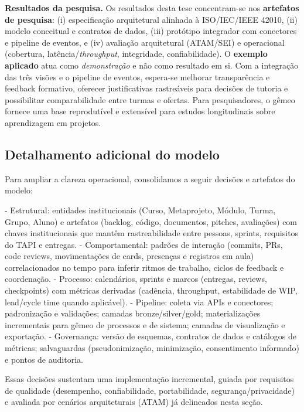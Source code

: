 \documentclass[12pt,a4paper]{article}
\begin{document}
\textbf{Resultados da pesquisa.} Os resultados desta tese concentram-se nos \textbf{artefatos de pesquisa}: (i) especificação arquitetural alinhada à ISO/IEC/IEEE 42010, (ii) modelo conceitual e contratos de dados, (iii) protótipo integrador com conectores e pipeline de eventos, e (iv) avaliação arquitetural (ATAM/SEI) e operacional (cobertura, latência/\textit{throughput}, integridade, confiabilidade). O \textbf{exemplo aplicado} atua como \emph{demonstração} e não como resultado em si. Com a integração das três visões e o pipeline de eventos, espera-se melhorar transparência e feedback formativo, oferecer justificativas rastreáveis para decisões de tutoria e possibilitar comparabilidade entre turmas e ofertas. Para pesquisadores, o gêmeo fornece uma base reprodutível e extensível para estudos longitudinais sobre aprendizagem em projetos.

\subsection{Detalhamento adicional do modelo}

Para ampliar a clareza operacional, consolidamos a seguir decisões e artefatos do modelo:

- Estrutural: entidades institucionais (Curso, Metaprojeto, Módulo, Turma, Grupo, Aluno) e artefatos (backlog, código, documentos, pitches, avaliações) com chaves institucionais que mantêm rastreabilidade entre pessoas, sprints, requisitos do TAPI e entregas.
- Comportamental: padrões de interação (commits, PRs, code reviews, movimentações de cards, presenças e registros em aula) correlacionados no tempo para inferir ritmos de trabalho, ciclos de feedback e coordenação.
- Processo: calendários, sprints e marcos (entregas, reviews, checkpoints) com métricas derivadas (cadência, throughput, estabilidade de WIP, lead/cycle time quando aplicável).
- Pipeline: coleta via APIs e conectores; padronização e validações; camadas bronze/silver/gold; materializações incrementais para gêmeo de processos e de sistema; camadas de visualização e exportação.
- Governança: versão de esquemas, contratos de dados e catálogos de métricas; salvaguardas (pseudonimização, minimização, consentimento informado) e pontos de auditoria.

Essas decisões sustentam uma implementação incremental, guiada por requisitos de qualidade (desempenho, confiabilidade, portabilidade, segurança/privacidade) e avaliada por cenários arquiteturais (ATAM) já delineados nesta seção.
\end{document}
